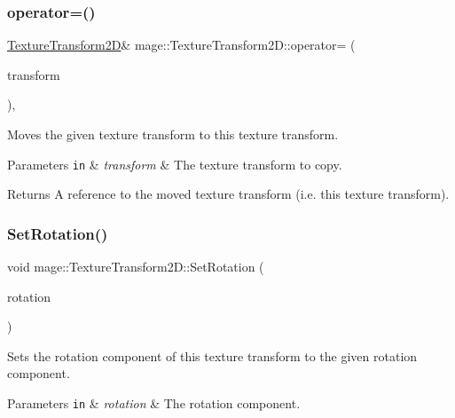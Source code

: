 \subsubsection{\texorpdfstring{operator=()}{operator=()}\hspace{0.1cm}{\footnotesize\ttfamily [2/2]}}
{\footnotesize\ttfamily \mbox{\hyperlink{classmage_1_1_texture_transform2_d}{Texture\+Transform2D}}\& mage\+::\+Texture\+Transform2\+D\+::operator= (\begin{DoxyParamCaption}\item[{\mbox{\hyperlink{classmage_1_1_texture_transform2_d}{Texture\+Transform2D}} \&\&}]{transform }\end{DoxyParamCaption})\hspace{0.3cm}{\ttfamily [default]}, {\ttfamily [noexcept]}}

Moves the given texture transform to this texture transform.


\begin{DoxyParams}[1]{Parameters}
\mbox{\tt in}  & {\em transform} & The texture transform to copy. \\
\hline
\end{DoxyParams}
\begin{DoxyReturn}{Returns}
A reference to the moved texture transform (i.\+e. this texture transform). 
\end{DoxyReturn}
\mbox{\label{classmage_1_1_texture_transform2_d_a136959b904e358f0008321a0f86a55a8}} 
\subsubsection{\texorpdfstring{Set\+Rotation()}{SetRotation()}}
{\footnotesize\ttfamily void mage\+::\+Texture\+Transform2\+D\+::\+Set\+Rotation (\begin{DoxyParamCaption}\item[{\mbox{\hyperlink{namespacemage_aa97e833b45f06d60a0a9c4fc22ae02c0}{F32}}}]{rotation }\end{DoxyParamCaption})\hspace{0.3cm}{\ttfamily [noexcept]}}

Sets the rotation component of this texture transform to the given rotation component.


\begin{DoxyParams}[1]{Parameters}
\mbox{\tt in}  & {\em rotation} & The rotation component. \\
\hline
\end{DoxyParams}
\mbox{\label{classmage_1_1_texture_transform2_d_aefa487dadb8b10cc99c98760be349519}} 
